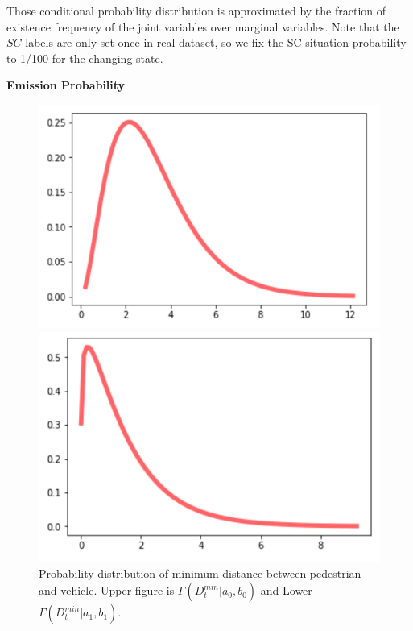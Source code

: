\documentclass[10pt,twocolumn,letterpaper]{article}
\begin{document}
    Those conditional probability distribution is approximated by the fraction of
    existence frequency of the joint variables over marginal variables. Note that 
    the $SC$ labels are only set once in real dataset, so we fix the SC situation 
    probability to 1/100 for the changing state.
    

    \noindent
    \textbf{Emission Probability}
    \begin{figure}[t]
        \begin{center}
           \includegraphics[width=0.9\linewidth]{images/sc0.png}
        \end{center}
        \begin{center}
            \includegraphics[width=0.9\linewidth]{images/sc1.png}
         \end{center}
        \caption{Probability distribution of minimum distance between pedestrian and vehicle. Upper
        figure is $\Gamma(D_t^{min}|a_{0}, b_{0})$ and Lower $\Gamma(D_t^{min}|a_{1}, b_{1})$.}
        \label{fig:long}
        \label{fig:onecol}
        \label{gamma}
    \end{figure}
\end{document}
